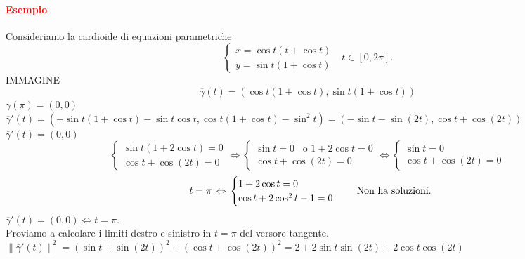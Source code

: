 \documentclass{article}
\begin{document}
\paragraph{\textcolor{red}{Esempio}}
Consideriamo la cardioide di equazioni parametriche
\begin{equation*}
    \begin{cases}
        x=\cos t(t+\cos t)\\
        y=\sin t(1+\cos t)
    \end{cases}\,\,\,\, t \in [0,2\pi].
\end{equation*}
IMMAGINE
\begin{equation*}
    \overline{\gamma}(t)=(\cos t(1+\cos t),\sin t(1+\cos t))
\end{equation*}
$\overline{\gamma}(\pi)=(0,0)$\\
$\overline{\gamma}'(t)=(-\sin t (1+\cos t)-\sin t\cos t, \cos t (1+\cos t)-\sin ^2t )=(-\sin t- \sin (2t),\cos t + \cos (2t))$\\
$\overline{\gamma}'(t)=(0,0)$\\
\begin{equation*}
    \begin{cases}
        \sin t (1+2 \cos t)=0\\
        \cos t + \cos (2t)=0
    \end{cases}\Leftrightarrow
    \begin{cases}
        \sin t =0\,\,\, \text{  o  }1+2\cos t =0\\
        \cos t + \cos (2t)=0
    \end{cases}\Leftrightarrow
    \begin{cases}
        \sin t =0\\
        \cos t + \cos (2t)=0
    \end{cases}
\end{equation*}
\begin{equation*}
    \,\,\, t=\pi\, \Leftrightarrow\\
    \begin{cases}
        1+2\cos t =0\\
        \cos t +2 \cos^2 t-1=0
    \end{cases}
    \,\,\,\,\,\,\, \text{Non ha soluzioni.}
\end{equation*}
$\overline{\gamma}'(t)=(0,0) \Leftrightarrow t=\pi$.\\
Proviamo a calcolare i limiti destro e sinistro in $t=\pi$ del versore tangente.\\
$\|\overline{\gamma}'(t)\|^2=(\sin t + \sin (2t))^2+(\cos t +\cos (2t))^2=2+2\sin t \sin (2t)+2\cos t \cos (2t)$\\
\end{document}

